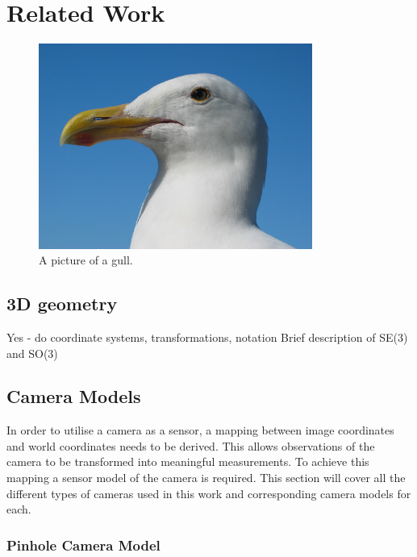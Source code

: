 \chapter{Related Work}
\label{chapter:Related_Work}

\begin{figure}[h!]
  \caption{A picture of a gull.}
  \centering
    \includegraphics[width=0.8\textwidth]{chapters/images/gull}
\end{figure}

\section{3D geometry}

Yes  - do coordinate systems, transformations, notation
Brief description of SE(3) and SO(3)

\section{Camera Models}

In order to utilise a camera as a sensor, a mapping between image coordinates and world
coordinates needs to be derived.  This allows observations of the camera to be transformed into
meaningful measurements.  To achieve this mapping a sensor model of the camera is required. This
section will cover all the different types of cameras used in this work and corresponding camera
models for each. 

\subsection{Pinhole Camera Model}
\label{subsec:pinhole_cam}


